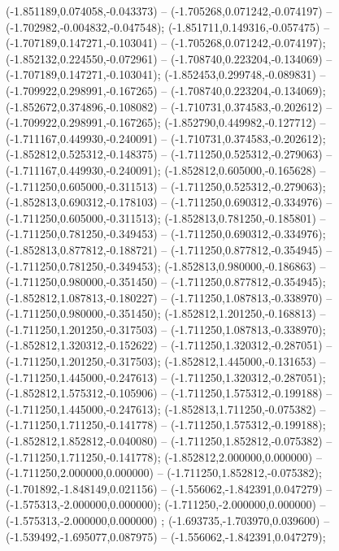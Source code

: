  (-1.851189,0.074058,-0.043373) -- (-1.705268,0.071242,-0.074197) -- (-1.702982,-0.004832,-0.047548);
 (-1.851711,0.149316,-0.057475) -- (-1.707189,0.147271,-0.103041) -- (-1.705268,0.071242,-0.074197);
 (-1.852132,0.224550,-0.072961) -- (-1.708740,0.223204,-0.134069) -- (-1.707189,0.147271,-0.103041);
 (-1.852453,0.299748,-0.089831) -- (-1.709922,0.298991,-0.167265) -- (-1.708740,0.223204,-0.134069);
 (-1.852672,0.374896,-0.108082) -- (-1.710731,0.374583,-0.202612) -- (-1.709922,0.298991,-0.167265);
 (-1.852790,0.449982,-0.127712) -- (-1.711167,0.449930,-0.240091) -- (-1.710731,0.374583,-0.202612);
 (-1.852812,0.525312,-0.148375) -- (-1.711250,0.525312,-0.279063) -- (-1.711167,0.449930,-0.240091);
 (-1.852812,0.605000,-0.165628) -- (-1.711250,0.605000,-0.311513) -- (-1.711250,0.525312,-0.279063);
 (-1.852813,0.690312,-0.178103) -- (-1.711250,0.690312,-0.334976) -- (-1.711250,0.605000,-0.311513);
 (-1.852813,0.781250,-0.185801) -- (-1.711250,0.781250,-0.349453) -- (-1.711250,0.690312,-0.334976);
 (-1.852813,0.877812,-0.188721) -- (-1.711250,0.877812,-0.354945) -- (-1.711250,0.781250,-0.349453);
 (-1.852813,0.980000,-0.186863) -- (-1.711250,0.980000,-0.351450) -- (-1.711250,0.877812,-0.354945);
 (-1.852812,1.087813,-0.180227) -- (-1.711250,1.087813,-0.338970) -- (-1.711250,0.980000,-0.351450);
 (-1.852812,1.201250,-0.168813) -- (-1.711250,1.201250,-0.317503) -- (-1.711250,1.087813,-0.338970);
 (-1.852812,1.320312,-0.152622) -- (-1.711250,1.320312,-0.287051) -- (-1.711250,1.201250,-0.317503);
 (-1.852812,1.445000,-0.131653) -- (-1.711250,1.445000,-0.247613) -- (-1.711250,1.320312,-0.287051);
 (-1.852812,1.575312,-0.105906) -- (-1.711250,1.575312,-0.199188) -- (-1.711250,1.445000,-0.247613);
 (-1.852813,1.711250,-0.075382) -- (-1.711250,1.711250,-0.141778) -- (-1.711250,1.575312,-0.199188);
 (-1.852812,1.852812,-0.040080) -- (-1.711250,1.852812,-0.075382) -- (-1.711250,1.711250,-0.141778);
 (-1.852812,2.000000,0.000000) -- (-1.711250,2.000000,0.000000) -- (-1.711250,1.852812,-0.075382);
 (-1.701892,-1.848149,0.021156) -- (-1.556062,-1.842391,0.047279) -- (-1.575313,-2.000000,0.000000);
 (-1.711250,-2.000000,0.000000) -- (-1.575313,-2.000000,0.000000) ;
 (-1.693735,-1.703970,0.039600) -- (-1.539492,-1.695077,0.087975) -- (-1.556062,-1.842391,0.047279);
